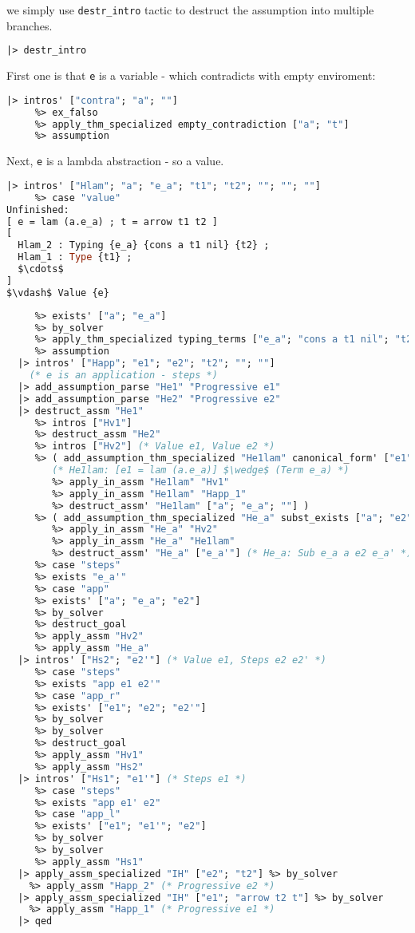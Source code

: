 \documentclass[english, mgr]{iithesis}
\renewcommand{\tt}[1]{\texttt{\small{#1}}}
\begin{document}
we simply use \tt{{destr\_intro}} tactic to destruct the assumption into multiple branches.
\begin{lstlisting}[language=OCaml]
  |> destr_intro
\end{lstlisting}
First one is that \tt{e} is a variable - which contradicts with empty enviroment:
\begin{lstlisting}[language=OCaml]
  |> intros' ["contra"; "a"; ""]
     %> ex_falso
     %> apply_thm_specialized empty_contradiction ["a"; "t"]
     %> assumption
\end{lstlisting}
Next, \tt{e} is a lambda abstraction - so a value.
\begin{lstlisting}[mathescape, language=OCaml]
  |> intros' ["Hlam"; "a"; "e_a"; "t1"; "t2"; ""; ""; ""]
     %> case "value"
Unfinished:
[ e = lam (a.e_a) ; t = arrow t1 t2 ]
[
  Hlam_2 : Typing {e_a} {cons a t1 nil} {t2} ;
  Hlam_1 : Type {t1} ;
  $\cdots$
]
$\vdash$ Value {e}
\end{lstlisting}
\begin{lstlisting}[language=OCaml]
     %> case "lam"
     %> exists' ["a"; "e_a"]
     %> by_solver
     %> apply_thm_specialized typing_terms ["e_a"; "cons a t1 nil"; "t2"]
     %> assumption
  |> intros' ["Happ"; "e1"; "e2"; "t2"; ""; ""]
    (* e is an application - steps *)
  |> add_assumption_parse "He1" "Progressive e1"
  |> add_assumption_parse "He2" "Progressive e2"
  |> destruct_assm "He1"
     %> intros ["Hv1"]
     %> destruct_assm "He2"
     %> intros ["Hv2"] (* Value e1, Value e2 *)
     %> ( add_assumption_thm_specialized "He1lam" canonical_form' ["e1"; "t2"; "t"]
        (* He1lam: [e1 = lam (a.e_a)] $\wedge$ (Term e_a) *)
        %> apply_in_assm "He1lam" "Hv1"
        %> apply_in_assm "He1lam" "Happ_1"
        %> destruct_assm' "He1lam" ["a"; "e_a"; ""] )
     %> ( add_assumption_thm_specialized "He_a" subst_exists ["a"; "e2"; "e_a"]
        %> apply_in_assm "He_a" "Hv2"
        %> apply_in_assm "He_a" "He1lam"
        %> destruct_assm' "He_a" ["e_a'"] (* He_a: Sub e_a a e2 e_a' *) )
     %> case "steps"
     %> exists "e_a'"
     %> case "app"
     %> exists' ["a"; "e_a"; "e2"]
     %> by_solver
     %> destruct_goal
     %> apply_assm "Hv2"
     %> apply_assm "He_a"
  |> intros' ["Hs2"; "e2'"] (* Value e1, Steps e2 e2' *)
     %> case "steps"
     %> exists "app e1 e2'"
     %> case "app_r"
     %> exists' ["e1"; "e2"; "e2'"]
     %> by_solver
     %> by_solver
     %> destruct_goal
     %> apply_assm "Hv1"
     %> apply_assm "Hs2"
  |> intros' ["Hs1"; "e1'"] (* Steps e1 *)
     %> case "steps"
     %> exists "app e1' e2"
     %> case "app_l"
     %> exists' ["e1"; "e1'"; "e2"]
     %> by_solver
     %> by_solver
     %> apply_assm "Hs1"
  |> apply_assm_specialized "IH" ["e2"; "t2"] %> by_solver
    %> apply_assm "Happ_2" (* Progressive e2 *)
  |> apply_assm_specialized "IH" ["e1"; "arrow t2 t"] %> by_solver
    %> apply_assm "Happ_1" (* Progressive e1 *)
  |> qed
\end{lstlisting}
\end{document}
